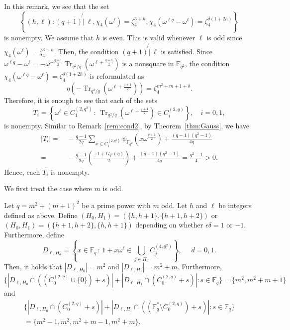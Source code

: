 \documentclass[ALCO,ThmDefs,Unicode]{cedram}
\DeclareMathOperator{\Tr}{Tr}
\newcommand*\F{{\mathbb F}}
\newcommand*{\notmid}{\mathbin{\not{|}\:}}
\begin{document}
\begin{rema}\label{rem:cond24}
In this remark, we see that the set
\[
\left\{(h,\ell):(q+1) \notmid \ell, \chi_4(\omega^{\ell})=\zeta_4^{3+h},
\chi_4(\omega^{\ell q}-\omega^{\ell})=\zeta_4^{\delta (1+2h)} \right\}
\]
is nonempty. We assume that $h$ is even. This is valid whenever $\ell$ is odd since $ \chi_4(\omega^{\ell})=\zeta_4^{3+h}$. Then, the condition $(q+1)\notmid \ell$ is satisfied. Since $\omega^{\ell q}-\omega^\ell=-\omega^{-\frac{q+1}{2}}\Tr_{q^2/q}(\omega^{\ell+\frac{q+1}{2}})$ is a nonsquare in $\F_{q^2}$, the condition $\chi_4(\omega^{\ell q}-\omega^{\ell})=\zeta_4^{\delta (1+2h)}$ is reformulated as
\[
\eta(-\Tr_{q^2/q}(\omega^{\ell+\frac{q+1}{2}}))=\zeta_4^{m^2+m+1+\delta }.
\]
Therefore, it is enough to see that each of the sets
\[
T_i=\left\{\omega^\ell\in C_{1}^{(2,q^2)}\,:\,\Tr_{q^2/q}(\omega^{\ell+\frac{q+1}{2}})\in C_i^{(2,q)}\right\}, \quad i=0,1,
\]
is nonempty. Similar to Remark~\ref{rem:cond2}, by Theorem~\ref{thm:Gauss}, we have
\begin{align*}
|T_i|=&\,-\frac{q-1}{2q}\sum_{x\in C_1^{(2,q^2)}}\psi_{\F_{q^2}}(x\omega^{\frac{q+1}{2}})+\frac{(q-1)(q^2-1)}{4q}\\
=&\,-\frac{q-1}{2q}\left(\frac{-1+G_{q^2}(\eta)}{2}\right)+\frac{(q-1)(q^2-1)}{4q}=\frac{q^2-1}{4}>0.
\end{align*}
Hence, each $T_i$ is nonempty.
\end{rema}

We first treat the case where $m$ is odd.

\begin{theo}\label{thm:twoint2}
Let $q=m^2+(m+1)^2$ be a prime power with $m$ odd. Let $h$ and $\ell$ be integers defined as above. Define $(H_0,H_1)=(\{h,h+1\},\{h+1,h+2\})$ or $(H_0,H_1)=(\{h+1,h+2\},\{h,h+1\})$ depending on whether $\epsilon \delta=1$ or $-1$. Furthermore, define
\[
D_{\ell,H_d}=\left\{x\in \F_q\,:\, 1+x\omega^\ell\in \bigcup_{j\in H_d}C_j^{(4,q^2)} \right\}, \quad \, \, d=0,1.
\]
Then, it holds that $|D_{\ell,H_0}|=m^2$ and $|D_{\ell,H_1}|=m^2+m$. Furthermore,
\[
\{|D_{\ell,H_0}\cap ((C_0^{(2,q)}\cup \{0\})+s)|+|D_{\ell,H_1}\cap (C_0^{(2,q)}+s)|:s\in \F_q\}=\{m^2,m^2+m+1\}
\]
and
\begin{multline*}
\{|D_{\ell,H_0}\cap (C_0^{(2,q)}+s)|+|D_{\ell,H_1}\cap ((\F_q^\ast\setminus C_0^{(2,q)})+s)|:s\in \F_q\}\\= \{m^2-1,m^2,m^2+m-1,m^2+m\}.
\end{multline*}
\end{theo}
\end{document}
